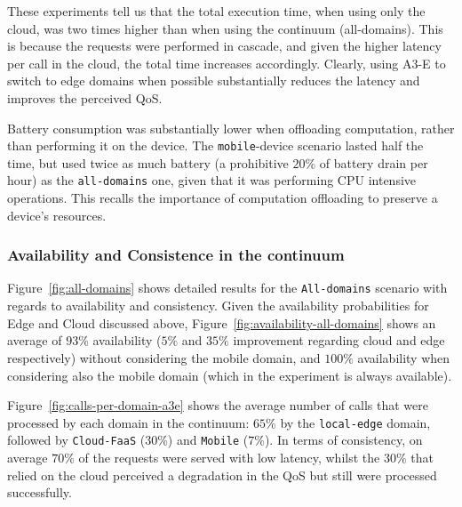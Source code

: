 These experiments tell us that the total execution time, when using only the cloud, was two times higher than when using the continuum (all-domains). This is because the requests were performed in cascade, and given the higher latency per call in the cloud, the total time increases accordingly. Clearly, using A3-E to switch to edge domains when possible substantially reduces the latency and improves the perceived QoS.

Battery consumption was substantially lower when offloading computation, rather than performing it on the device. The \texttt{mobile}-device scenario lasted half the time, but used twice as much battery (a prohibitive $20$\% of battery drain per hour) as the \texttt{all-domains} one, given that it was performing CPU intensive operations. This recalls the importance of computation offloading to preserve a device's resources.

\subsubsection{Availability and Consistence in the continuum}

Figure~\ref{fig:all-domains} shows detailed results for the \texttt{All-domains} scenario with regards to availability and consistency. 
Given the availability probabilities for Edge and Cloud discussed above, Figure~\ref{fig:availability-all-domains} shows an average of $93\%$ availability ($5\%$ and $35\%$ improvement regarding cloud and edge respectively) without considering the mobile domain, and $100\%$ availability when considering also the mobile domain (which in the experiment is always available). 

Figure~\ref{fig:calls-per-domain-a3e} shows the average number of calls that were processed by each domain in the continuum: $65$\% by the \texttt{local-edge} domain, followed by \texttt{Cloud-FaaS} ($30$\%) and \texttt{Mobile} ($7$\%). In terms of consistency, on average $70\%$ of the requests were served with low latency, whilst the $30\%$ that relied on the cloud perceived a degradation in the QoS but still were processed successfully.
 
